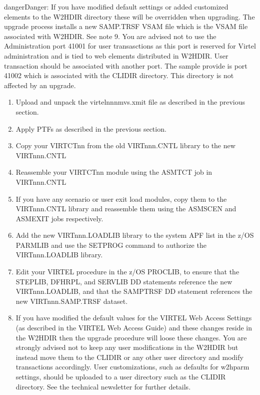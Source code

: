 \documentclass[letterpaper,10pt,english]{sphinxmanual}
\begin{document}
\begin{sphinxadmonition}{danger}{Danger:}
\sphinxAtStartPar
If you have modified default settings or added customized elements to the W2H\sphinxhyphen{}DIR directory these will be overridden when upgrading. The upgrade process installs a new SAMP.TRSF VSAM file which is the VSAM file associated with W2H\sphinxhyphen{}DIR. See note 9. You are advised not to use the Administration port 41001 for user transasctions as this port is reserved for Virtel administration and is tied to web elements distributed in W2H\sphinxhyphen{}DIR. User transaction should be associated with another port. The sample provide is port 41002 which is associated with the CLI\sphinxhyphen{}DIR directory. This directory is not affected by an upgrade.
\end{sphinxadmonition}
\begin{enumerate}
%
\item {} 
\sphinxAtStartPar
Upload and unpack the virtelnnnmvs.xmit file as described in the previous section.

\item {} 
\sphinxAtStartPar
Apply PTFs as described in the previous section.

\item {} 
\sphinxAtStartPar
Copy your VIRTCTnn from the old VIRTnnn.CNTL library to the new VIRTnnn.CNTL

\item {} 
\sphinxAtStartPar
Reassemble your VIRTCTnn module using the ASMTCT job in VIRTnnn.CNTL

\item {} 
\sphinxAtStartPar
If you have any scenario or user exit load modules, copy them to the VIRTnnn.CNTL library and reassemble them using the ASMSCEN and ASMEXIT jobs respectively.

\item {} 
\sphinxAtStartPar
Add the new VIRTnnn.LOADLIB library to the system APF list in the z/OS PARMLIB and use the SETPROG command to authorize the VIRTnnn.LOADLIB library.

\item {} 
\sphinxAtStartPar
Edit your VIRTEL procedure in the z/OS PROCLIB, to ensure that the STEPLIB, DFHRPL, and SERVLIB DD statements reference the new VIRTnnn.LOADLIB, and that the SAMPTRSF DD statement references the new VIRTnnn.SAMP.TRSF dataset.

\item {} 
\sphinxAtStartPar
If you have modified the default values for the VIRTEL Web Access Settings (as described in the VIRTEL Web Access Guide) and these changes reside in the W2H\sphinxhyphen{}DIR then the upgrade procedure will loose these changes. You are strongly advised not to keep any user modifications in the W2H\sphinxhyphen{}DIR but instead move them to the CLI\sphinxhyphen{}DIR or any other user directory and modify transactions accordingly. User customizations, such as defaults for w2hparm settings, should be uploaded to a user directory such as the CLI\sphinxhyphen{}DIR directory. See the technical newsletter  for further details.


\end{enumerate}
\end{document}
